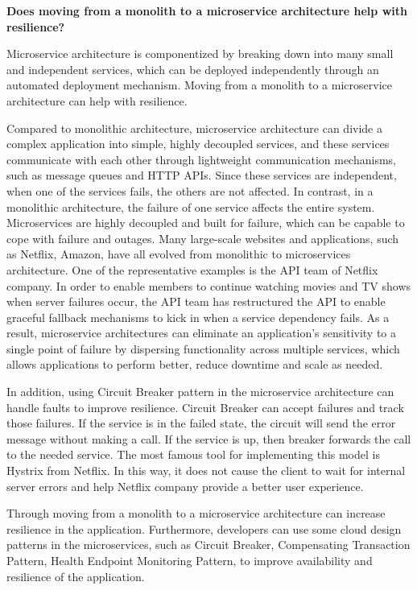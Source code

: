 \documentclass[12pt]{article}
\begin{document}
\begin{sloppypar}
\pagestyle{empty}

{\bf Does moving from a monolith to a microservice architecture help with resilience?}

Microservice architecture is componentized by breaking down into many small and independent services, which can be deployed independently through an automated deployment mechanism. Moving from a monolith to a microservice architecture can help with resilience.

Compared to monolithic architecture, microservice architecture can divide a complex application into simple, highly decoupled services, and these services communicate with each other through lightweight communication mechanisms, such as message queues and HTTP APIs\cite{ct1}. Since these services are independent, when one of the services fails, the others are not affected. In contrast, in a monolithic architecture, the failure of one service affects the entire system. Microservices are highly decoupled and built for failure, which can be capable to cope with failure and outages\cite{ct1}. Many large-scale websites and applications, such as Netflix, Amazon, have all evolved from monolithic to microservices architecture. One of the representative examples is the API team of Netflix company\cite{ct2}. In order to enable members to continue watching movies and TV shows when server failures occur, the API team has restructured the API to enable graceful fallback mechanisms to kick in when a service dependency fails\cite{ct2}. As a result, microservice architectures can eliminate an application's sensitivity to a single point of failure by dispersing functionality across multiple services, which allows applications to perform better, reduce downtime and scale as needed\cite{ct3}. 

In addition, using Circuit Breaker pattern in the microservice architecture can handle faults to improve resilience. Circuit Breaker can accept failures and track those failures\cite{ct4}. If the service is in the failed state, the circuit will send the error message without making a call. If the service is up, then breaker forwards the call to the needed service. The most famous tool for implementing this model is Hystrix from Netflix\cite{ct4}. In this way, it does not cause the client to wait for internal server errors and help Netflix company provide a better user experience.

Through moving from a monolith to a microservice architecture can increase resilience in the application. Furthermore, developers can use some cloud design patterns in the microservices, such as Circuit Breaker\cite{ct4}, Compensating Transaction Pattern\cite{ct4}, Health Endpoint Monitoring Pattern\cite{ct4}, to improve availability and resilience of the application.



\end{sloppypar}
\end{document}
